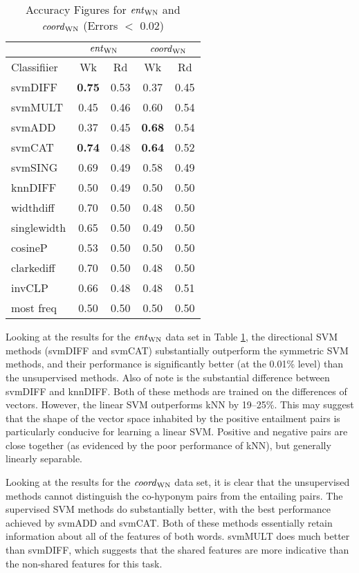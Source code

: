 \documentclass[11pt]{article}
\newcommand\entWN{\mbox{\em ent\/}_{\mbox{\scriptsize WN}}}
\newcommand\coordWN{\mbox{\em coord\/}_{\mbox{\scriptsize WN}}}
\begin{document}
\begin{table}[ht]
\centering
\begin{tabular}{|l|c|c|c|c|}
\hline
&\multicolumn{2}{|c|}{$\entWN$}&\multicolumn{2}{|c|}{$\coordWN$}\\
\hline
Classifiier&Wk&Rd&Wk&Rd\\
\hline
svmDIFF&\textbf{0.75}&0.53&0.37&0.45\\
svmMULT&0.45&0.46&0.60&0.54\\
svmADD&0.37&0.45&\textbf{0.68}&0.54\\
svmCAT&\textbf{0.74}&0.48&\textbf{0.64}&0.52\\
svmSING&0.69&0.49&0.58&0.49\\
knnDIFF&0.50&0.49&0.50&0.50\\
\hline
widthdiff&0.70&0.50&0.48&0.50\\
singlewidth&0.65&0.50&0.49&0.50\\
cosineP&0.53&0.50&0.50&0.50\\
clarkediff&0.70&0.50&0.48&0.50\\
invCLP&0.66&0.48&0.48&0.51\\
most freq&0.50&0.50&0.50&0.50\\
\hline
\end{tabular}
\caption{Accuracy Figures for $\entWN$ and $\coordWN$ (Errors $<$ 0.02)}
\label{table:results_WN}
\end{table}

Looking at the results for the $\entWN$ data set in Table \ref{table:results_WN}, the directional SVM methods (svmDIFF and svmCAT)  substantially outperform the symmetric SVM methods, and their performance is significantly better (at the 0.01\% level) than the unsupervised methods.  Also of note is the substantial difference between svmDIFF and knnDIFF.  Both of these methods are trained on the differences of vectors.  However, the linear SVM outperforms kNN by 19--25\%.  This may suggest that the shape of the vector space inhabited by the positive entailment pairs is particularly conducive for learning a linear SVM.  Positive and negative pairs are close together (as evidenced by the poor performance of kNN), but generally linearly separable.

Looking at the results for the $\coordWN$ data set, it is clear that the unsupervised methods cannot distinguish the co-hyponym pairs from the entailing pairs.  The supervised SVM methods do substantially better, with the best performance achieved by svmADD and svmCAT.  Both of these methods essentially retain information about all of the features of both words.  svmMULT does much better than svmDIFF, which suggests that the shared features are more indicative than the non-shared features for this task. 
\end{document}
